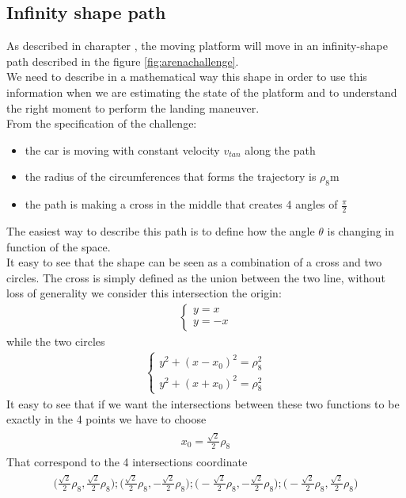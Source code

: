 \subsection{Infinity shape path}
As described in charapter \label{chap:thechallenge}, the moving platform will move in an infinity-shape path described in the figure \ref{fig:arenachallenge}. \\
We need to describe in a mathematical way this shape in order to use this information when we are estimating the state of the platform and to understand the right moment to perform the landing maneuver.\\
From the specification of the challenge:
\begin{itemize}
\item the car is moving with constant velocity $v_{tan}$ along the path
\item the radius of the circumferences that forms the trajectory is $\rho_{8}$m
\item the path is making a cross in the middle that creates 4 angles of $\frac{\pi}{2}$ 
\end{itemize}
The easiest way to describe this path is to define how the angle $\theta$ is changing in function of the space. \\
It easy to see that the shape can be seen as a combination of a cross and two circles.
The cross is simply defined as the union between the two line, without loss of generality we consider this intersection the origin:
\begin{align*}
\begin{cases}
y = x \\[10pt]
y = -x
\end{cases}
\end{align*}
while the two circles 
\begin{align*}
\begin{cases}
y^2 + (x - x_0)^2 = \rho_{8}^2 \\[10pt]
y^2 + (x + x_0)^2 = \rho_{8}^2 
\end{cases}
\end{align*}
It easy to see that if we want the intersections between these two functions to be exactly in the 4 points we have to choose 
\begin{align*}
\begin{split}
x_0 = \frac{\sqrt{2}}{2}\rho_{8}
\end{split}
\end{align*}
That correspond to the 4 intersections coordinate
\begin{align*}
\begin{split}
\Big(\frac{\sqrt{2}}{2}\rho_{8},\frac{\sqrt{2}}{2}\rho_{8}\Big);
\Big(\frac{\sqrt{2}}{2}\rho_{8},-\frac{\sqrt{2}}{2}\rho_{8}\Big);
\Big(-\frac{\sqrt{2}}{2}\rho_{8},-\frac{\sqrt{2}}{2}\rho_{8}\Big);
\Big(-\frac{\sqrt{2}}{2}\rho_{8},\frac{\sqrt{2}}{2}\rho_{8}\Big)
\end{split}
\end{align*}

